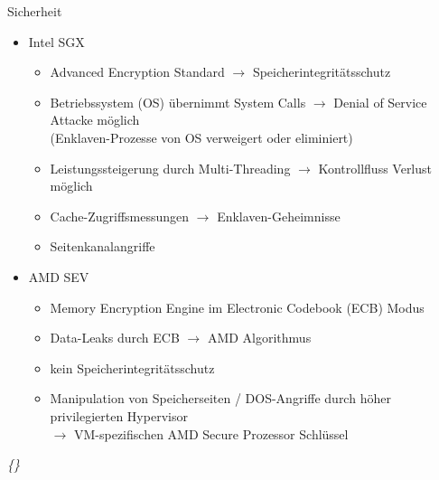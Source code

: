 \documentclass{sdqbeamer}
\begin{document}
\begin{frame}{Sicherheit}
	\begin{itemize}
		\item Intel SGX
		\begin{itemize}
			\item Advanced Encryption Standard
				\(\rightarrow\) Speicherintegritätsschutz
			\item Betriebssystem (OS) übernimmt System Calls
				\(\rightarrow\) Denial of Service Attacke möglich\\
				(Enklaven-Prozesse von OS verweigert oder eliminiert)
			\item Leistungssteigerung durch Multi-Threading
				\(\rightarrow\) Kontrollfluss Verlust möglich
			\item Cache-Zugriffsmessungen \(\rightarrow\) Enklaven-Geheimnisse
			\item Seitenkanalangriffe
		\end{itemize}
		\item AMD SEV
		\begin{itemize}
			\item Memory Encryption Engine im Electronic Codebook (ECB) Modus 
			\item Data-Leaks durch ECB \(\rightarrow\) AMD Algorithmus 
			\item kein Speicherintegritätsschutz
			\item Manipulation von Speicherseiten / DOS-Angriffe durch höher privilegierten Hypervisor\\
			\(\rightarrow\) VM-spezifischen AMD Secure Prozessor Schlüssel
		\end{itemize}
	\end{itemize}
	\vfill
	\textit{\{\cite{mofrad}\}}
\end{frame}
\end{document}

